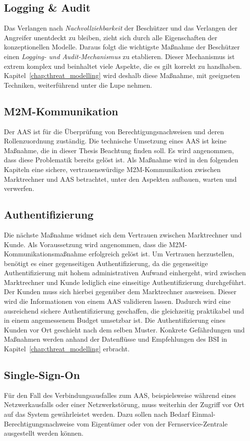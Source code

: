 \documentclass[11pt,a4paper]{report}
\begin{document}
\subsection{Logging \& Audit}
Das Verlangen nach \textit{Nachvollziehbarkeit} der Beschützer und das Verlangen der Angreifer unentdeckt zu bleiben, zieht sich durch alle Eigenschaften der konzeptionellen Modelle. Daraus folgt die wichtigste Maßnahme der Beschützer einen \textit{Logging- und Audit-Mechanismus} zu etablieren. Dieser Mechanismus ist extrem komplex und beinhaltet viele Aspekte, die es gilt korrekt zu handhaben. Kapitel~\ref{chap:threat_modelling} wird deshalb diese Maßnahme, mit geeigneten Techniken, weiterführend unter die Lupe nehmen.

\subsection{M2M-Kommunikation} 
Der AAS ist für die Überprüfung von Berechtigungsnachweisen und deren Rollenzuordnung zuständig. Die technische Umsetzung eines AAS ist keine Maßnahme, die in dieser Thesis Beachtung finden soll. Es wird angenommen, dass diese Problematik bereits gelöst ist. Als Maßnahme wird in den folgenden Kapiteln eine sichere, vertrauenswürdige M2M-Kommunikation zwischen Marktrechner und AAS betrachtet, unter den Aspekten aufbauen, warten und verwerfen.

\subsection{Authentifizierung} 
Die nächste Maßnahme widmet sich dem Vertrauen zwischen Marktrechner und Kunde. Als Voraussetzung wird angenommen, dass die M2M-Kommunikationsmaßnahme erfolgreich gelöst ist. Um Vertrauen herzustellen, benötigt es einer gegenseitigen Authentifizierung, da die gegenseitige Authentifizierung mit hohem administrativen Aufwand einhergeht, wird zwischen Marktrechner und Kunde lediglich eine einseitige Authentifizierung durchgeführt. Der Kunden muss sich hierbei gegenüber dem Marktrechner ausweisen. Dieser wird die Informationen von einem AAS validieren lassen. Dadurch wird eine ausreichend sichere Authentifizierung geschaffen, die gleichzeitig praktikabel und in einem angemessenem Budget umsetzbar ist. Die Authentifizierung eines Kunden vor Ort geschieht nach dem selben Muster. Konkrete Gefährdungen und Maßnahmen werden anhand der Datenflüsse und Empfehlungen des BSI in Kapitel~\ref{chap:threat_modelling} erbracht.

\subsection{Single-Sign-On}
Für den Fall des Verbindungsausfalles zum AAS, beispielsweise während eines Netzwerkausfalls oder einer Netzwerkstörung, muss weiterhin der Zugriff vor Ort auf das System gewährleistet werden. Dazu sollen nach Bedarf Einmal-Berechtigungsnachweise vom Eigentümer oder von der Fernservice-Zentrale ausgestellt werden können.
\end{document}
